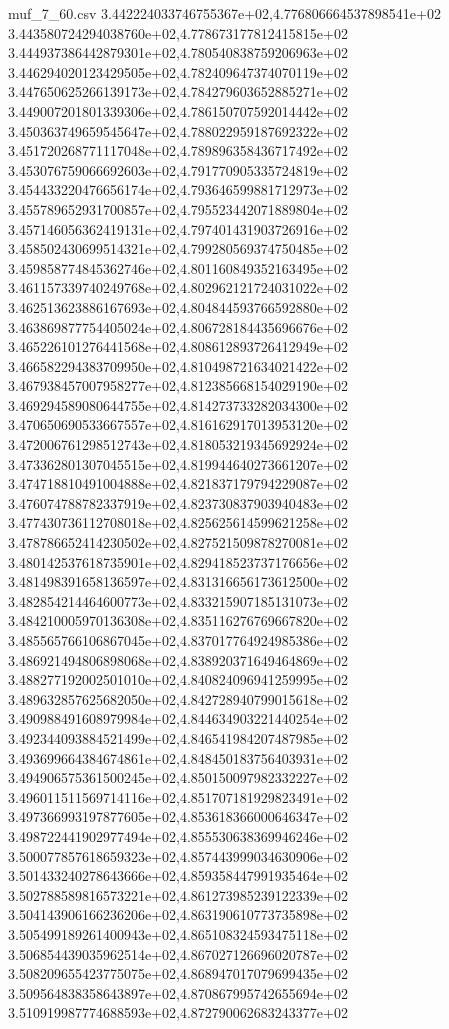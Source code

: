 \begin{filecontents*}{muf_7_60.csv}
3.442224033746755367e+02,4.776806664537898541e+02
3.443580724294038760e+02,4.778673177812415815e+02
3.444937386442879301e+02,4.780540838759206963e+02
3.446294020123429505e+02,4.782409647374070119e+02
3.447650625266139173e+02,4.784279603652885271e+02
3.449007201801339306e+02,4.786150707592014442e+02
3.450363749659545647e+02,4.788022959187692322e+02
3.451720268771117048e+02,4.789896358436717492e+02
3.453076759066692603e+02,4.791770905335724819e+02
3.454433220476656174e+02,4.793646599881712973e+02
3.455789652931700857e+02,4.795523442071889804e+02
3.457146056362419131e+02,4.797401431903726916e+02
3.458502430699514321e+02,4.799280569374750485e+02
3.459858774845362746e+02,4.801160849352163495e+02
3.461157339740249768e+02,4.802962121724031022e+02
3.462513623886167693e+02,4.804844593766592880e+02
3.463869877754405024e+02,4.806728184435696676e+02
3.465226101276441568e+02,4.808612893726412949e+02
3.466582294383709950e+02,4.810498721634021422e+02
3.467938457007958277e+02,4.812385668154029190e+02
3.469294589080644755e+02,4.814273733282034300e+02
3.470650690533667557e+02,4.816162917013953120e+02
3.472006761298512743e+02,4.818053219345692924e+02
3.473362801307045515e+02,4.819944640273661207e+02
3.474718810491004888e+02,4.821837179794229087e+02
3.476074788782337919e+02,4.823730837903940483e+02
3.477430736112708018e+02,4.825625614599621258e+02
3.478786652414230502e+02,4.827521509878270081e+02
3.480142537618735901e+02,4.829418523737176656e+02
3.481498391658136597e+02,4.831316656173612500e+02
3.482854214464600773e+02,4.833215907185131073e+02
3.484210005970136308e+02,4.835116276769667820e+02
3.485565766106867045e+02,4.837017764924985386e+02
3.486921494806898068e+02,4.838920371649464869e+02
3.488277192002501010e+02,4.840824096941259995e+02
3.489632857625682050e+02,4.842728940799015618e+02
3.490988491608979984e+02,4.844634903221440254e+02
3.492344093884521499e+02,4.846541984207487985e+02
3.493699664384674861e+02,4.848450183756403931e+02
3.494906575361500245e+02,4.850150097982332227e+02
3.496011511569714116e+02,4.851707181929823491e+02
3.497366993197877605e+02,4.853618366000646347e+02
3.498722441902977494e+02,4.855530638369946246e+02
3.500077857618659323e+02,4.857443999034630906e+02
3.501433240278643666e+02,4.859358447991935464e+02
3.502788589816573221e+02,4.861273985239122339e+02
3.504143906166236206e+02,4.863190610773735898e+02
3.505499189261400943e+02,4.865108324593475118e+02
3.506854439035962514e+02,4.867027126696020787e+02
3.508209655423775075e+02,4.868947017079699435e+02
3.509564838358643897e+02,4.870867995742655694e+02
3.510919987774688593e+02,4.872790062683243377e+02

\end{filecontents*}
